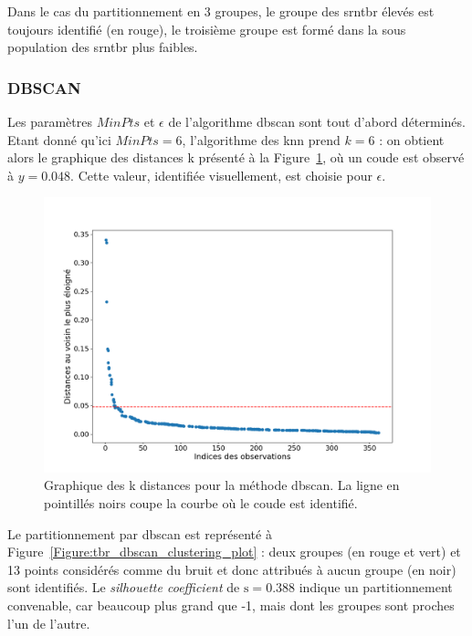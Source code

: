 Dans le cas du partitionnement en 3 groupes, le groupe des \gls{srntbr} élevés est toujours identifié (en rouge), le troisième groupe est formé dans 
la sous population des \gls{srntbr} plus faibles. 

\subsubsection{DBSCAN}

Les paramètres $MinPts$ et $\epsilon$ de l'algorithme \gls{dbscan} sont tout d'abord déterminés. Etant donné qu'ici $MinPts = 6$, 
l'algorithme des \gls{knn} prend $k = 6$ : on obtient alors le graphique des distances k présenté à la Figure~\ref{Figure:tbr_dbscan_kdistance_plot}, 
où un coude est observé à $y = 0.048$. Cette valeur, identifiée visuellement, est choisie pour $\epsilon$.

\begin{figure}[h!]
  \centering
	\includegraphics[width=0.7\linewidth]{figures/chapter-4/tbr-dbscan-knn-plot} 
  \caption[Graphique des k distances pour la méthode \gls{dbscan}.]{Graphique des k distances pour la méthode \gls{dbscan}. La ligne en pointillés noirs coupe la courbe où le coude est identifié.}
  \label{Figure:tbr_dbscan_kdistance_plot}
\end{figure}

Le partitionnement par \gls{dbscan} est représenté à Figure~\ref{Figure:tbr_dbscan_clustering_plot} : deux groupes (en rouge et vert) et 13 
points considérés comme du bruit et donc attribués à aucun groupe (en noir) sont identifiés. Le \textit{silhouette coefficient} de $\text{s} = 0.388$
indique un partitionnement convenable, car beaucoup plus grand que -1, mais dont les groupes sont proches l'un de l'autre. 

